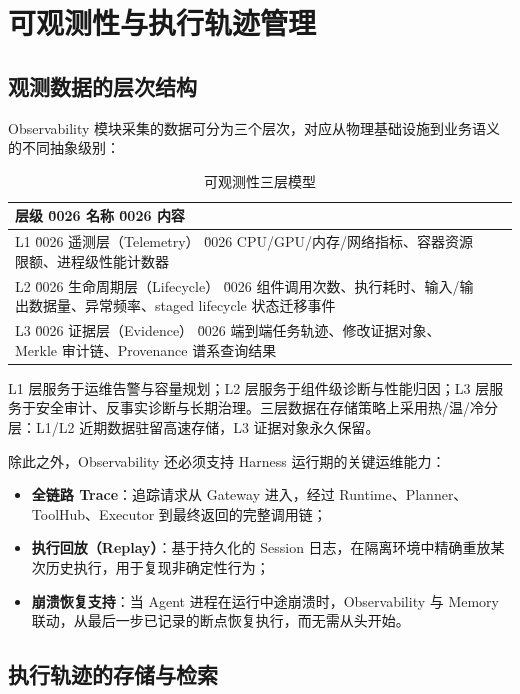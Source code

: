 \section{可观测性与执行轨迹管理}

\subsection{观测数据的层次结构}

Observability 模块采集的数据可分为三个层次，对应从物理基础设施到业务语义的不同抽象级别：

\begin{table}[htbp]
\centering
\caption{可观测性三层模型}
\label{tab:observability_layers}
\begin{tabular}{@{}lp{3.5cm}p{7.5cm}@{}}
\toprule
\textbf{层级} \u0026 \textbf{名称} \u0026 \textbf{内容} \\
\midrule
L1 \u0026 遥测层（Telemetry） \u0026 CPU/GPU/内存/网络指标、容器资源限额、进程级性能计数器 \\
L2 \u0026 生命周期层（Lifecycle） \u0026 组件调用次数、执行耗时、输入/输出数据量、异常频率、staged lifecycle 状态迁移事件 \\
L3 \u0026 证据层（Evidence） \u0026 端到端任务轨迹、修改证据对象、Merkle 审计链、Provenance 谱系查询结果 \\
\bottomrule
\end{tabular}
\end{table}

L1 层服务于运维告警与容量规划；L2 层服务于组件级诊断与性能归因；L3 层服务于安全审计、反事实诊断与长期治理。三层数据在存储策略上采用热/温/冷分层：L1/L2 近期数据驻留高速存储，L3 证据对象永久保留。

除此之外，Observability 还必须支持 Harness 运行期的关键运维能力：
\begin{itemize}
    \item \textbf{全链路 Trace}：追踪请求从 Gateway 进入，经过 Runtime、Planner、ToolHub、Executor 到最终返回的完整调用链；
    \item \textbf{执行回放（Replay）}：基于持久化的 Session 日志，在隔离环境中精确重放某次历史执行，用于复现非确定性行为；
    \item \textbf{崩溃恢复支持}：当 Agent 进程在运行中途崩溃时，Observability 与 Memory 联动，从最后一步已记录的断点恢复执行，而无需从头开始。
\end{itemize}

\subsection{执行轨迹的存储与检索}

